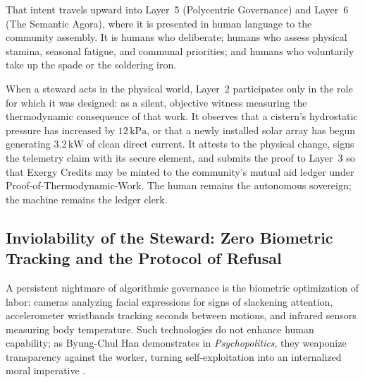 That intent travels upward into Layer~5 (Polycentric Governance) and Layer~6 (The Semantic Agora), where it is presented in human language to the community assembly. It is humans who deliberate; humans who assess physical stamina, seasonal fatigue, and communal priorities; and humans who voluntarily take up the spade or the soldering iron.

When a steward acts in the physical world, Layer~2 participates only in the role for which it was designed: as a silent, objective witness measuring the thermodynamic consequence of that work. It observes that a cistern's hydrostatic pressure has increased by $12\,\mathrm{kPa}$, or that a newly installed solar array has begun generating $3.2\,\mathrm{kW}$ of clean direct current. It attests to the physical change, signs the telemetry claim with its secure element, and submits the proof to Layer~3 so that Exergy Credits may be minted to the community's mutual aid ledger under Proof-of-Thermodynamic-Work. The human remains the autonomous sovereign; the machine remains the ledger clerk.

\subsection{Inviolability of the Steward: Zero Biometric Tracking and the Protocol of Refusal}

A persistent nightmare of algorithmic governance is the biometric optimization of labor: cameras analyzing facial expressions for signs of slackening attention, accelerometer wristbands tracking seconds between motions, and infrared sensors measuring body temperature. Such technologies do not enhance human capability; as Byung-Chul Han demonstrates in \textit{Psychopolitics}, they weaponize transparency against the worker, turning self-exploitation into an internalized moral imperative \parencite{han2015}.

